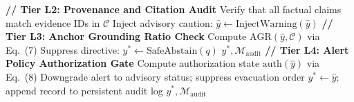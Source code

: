 \documentclass[conference]{IEEEtran}
\begin{document}
\begin{algorithm}[!t]
\caption{Deterministic Safety Enforcement Layer (DSEL)}
\begin{algorithmic}[1]
\STATE \textbf{// Tier L2: Provenance and Citation Audit}
\STATE Verify that all factual claims match evidence IDs in $\mathcal{C}$
  \STATE Inject advisory caution: $\hat{y} \leftarrow \mathrm{InjectWarning}(\hat{y})$
\ENDIF
\STATE \textbf{// Tier L3: Anchor Grounding Ratio Check}
\STATE Compute $\mathrm{AGR}(\hat{y}, \mathcal{C})$ via Eq.~(7)
  \STATE Suppress directive: $y^* \leftarrow \mathrm{SafeAbstain}(q)$
  \RETURN $y^*, \mathcal{M}_{\mathrm{audit}}$
\ENDIF
\STATE \textbf{// Tier L4: Alert Policy Authorization Gate}
  \STATE Compute authorization state $\mathrm{auth}(\hat{y})$ via Eq.~(8)
    \STATE Downgrade alert to advisory status; suppress evacuation order
  \ENDIF
\ENDIF
\STATE $y^* \leftarrow \hat{y}$; append record to persistent audit log
\RETURN $y^*, \mathcal{M}_{\mathrm{audit}}$
\end{algorithmic}
\end{algorithm}
\end{document}
